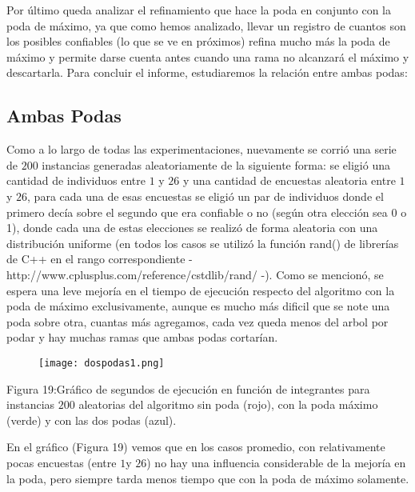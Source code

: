 \documentclass[A4paper,oneside,fleqn,10pt]{article}
\theoremstyle{definition}
\begin{document}
 Por último queda analizar el refinamiento que hace la poda en conjunto con la poda de máximo, ya que como hemos analizado, llevar un registro de cuantos son los posibles confiables (lo que se ve en próximos) refina mucho más la poda de máximo y permite darse cuenta antes cuando una rama no alcanzará el máximo y descartarla. Para concluir el informe, estudiaremos la relación entre ambas podas:
 
\subsection{Ambas Podas}
Como a lo largo de todas las experimentaciones, nuevamente se corrió una serie de $200$ instancias generadas aleatoriamente de la siguiente forma: se eligió una cantidad de individuos entre $1$ y $26$ y una cantidad de encuestas aleatoria entre $1$ y $26$, para cada una de esas encuestas se eligió un par de individuos donde el primero decía sobre el segundo que era confiable o no (según otra elección sea 0 o 1), donde cada una de estas elecciones se realizó de forma aleatoria con una distribución uniforme (en todos los casos se utilizó la función rand()  de librerías de C++ en el rango correspondiente - http://www.cplusplus.com/reference/cstdlib/rand/ -). Como se mencionó, se espera una leve mejoría en el tiempo de ejecución respecto del algoritmo con la poda de máximo exclusivamente, aunque es mucho más dificil que se note una poda sobre otra, cuantas más agregamos, cada vez queda menos del arbol por podar y hay muchas ramas que ambas podas cortarían.

\begin{figure}[!ht]
  \texttt{[image: dospodas1.png]}
    \label{fig:boat18}
    
\end{figure}

\scriptsize
  Figura 19:Gráfico de segundos de ejecución en función de integrantes para instancias $200$ aleatorias del algoritmo sin poda (rojo), con la poda máximo (verde) y con las dos podas (azul).

\normalsize
En el gráfico (Figura 19) vemos que en los casos promedio, con relativamente pocas encuestas (entre $1$y $26$) no hay una influencia considerable de la mejoría en la poda, pero siempre tarda menos tiempo que con la poda de máximo solamente.
\end{document}
